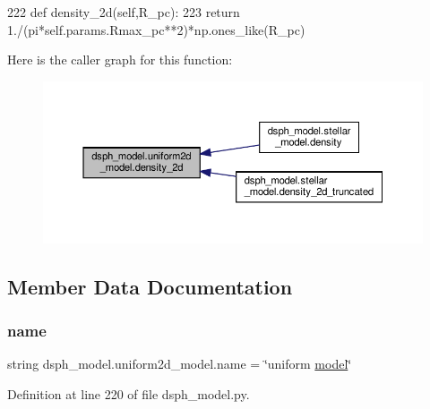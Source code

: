 \begin{DoxyCode}
222     \textcolor{keyword}{def }density\_2d(self,R\_pc):
223         \textcolor{keywordflow}{return} 1./(pi*self.params.Rmax\_pc**2)*np.ones\_like(R\_pc)
\end{DoxyCode}
Here is the caller graph for this function\+:\nopagebreak
\begin{figure}[H]
\begin{center}
\leavevmode
\includegraphics[width=350pt]{de/daa/classdsph__model_1_1uniform2d__model_aff33b4418158947e106a097c3a58a67e_icgraph}
\end{center}
\end{figure}


\subsection{Member Data Documentation}
\mbox{\label{classdsph__model_1_1uniform2d__model_a6675f4914587aa9b7e3dcc30fe717b20}} 
\subsubsection{\texorpdfstring{name}{name}}
{\footnotesize\ttfamily string dsph\+\_\+model.\+uniform2d\+\_\+model.\+name = \char`\"{}uniform \hyperlink{classdsph__model_1_1model}{model}\char`\"{}\hspace{0.3cm}{\ttfamily [static]}}



Definition at line 220 of file dsph\+\_\+model.\+py.

\mbox{\label{classdsph__model_1_1uniform2d__model_aa29df7124c2edd32617deddca0271eb7}} 

